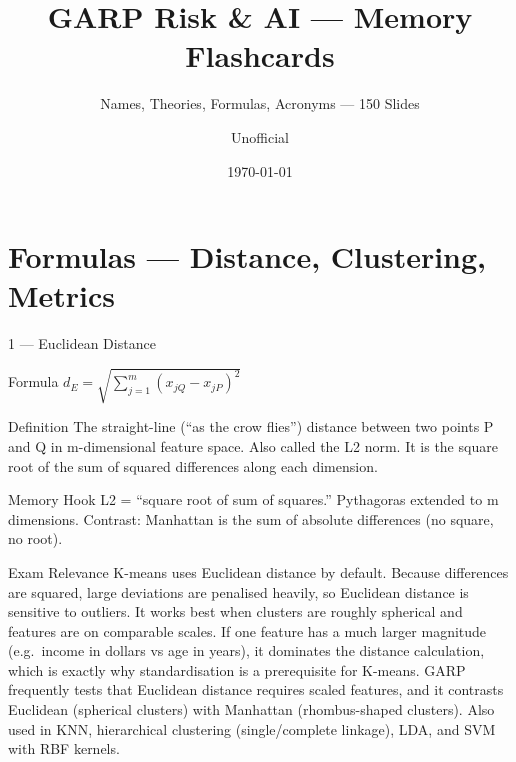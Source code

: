 \documentclass[aspectratio=169,8pt]{beamer}
\title[GARP RAI Memory]{GARP Risk \& AI --- Memory Flashcards}
\subtitle{Names, Theories, Formulas, Acronyms --- 150 Slides}
\author{Unofficial}
\date{\today}
\begin{document}
	
	\begin{frame}\titlepage\end{frame}
	
	\section{Formulas --- Distance, Clustering, Metrics}
	
	\begin{frame}{1 --- Euclidean Distance}
		\begin{block}{Formula}
			$d_E = \sqrt{\sum_{j=1}^{m}(x_{jQ} - x_{jP})^2}$
		\end{block}
		\begin{block}{Definition}
			The straight-line (``as the crow flies'') distance between two points P and Q in m-dimensional feature space. Also called the L2 norm. It is the square root of the sum of squared differences along each dimension.
		\end{block}
		\begin{block}{Memory Hook}
			L2 = ``square root of sum of squares.'' Pythagoras extended to m dimensions. Contrast: Manhattan is the sum of absolute differences (no square, no root).
		\end{block}
		\begin{block}{Exam Relevance}
			K-means uses Euclidean distance by default. Because differences are squared, large deviations are penalised heavily, so Euclidean distance is sensitive to outliers. It works best when clusters are roughly spherical and features are on comparable scales. If one feature has a much larger magnitude (e.g.\ income in dollars vs age in years), it dominates the distance calculation, which is exactly why standardisation is a prerequisite for K-means. GARP frequently tests that Euclidean distance requires scaled features, and it contrasts Euclidean (spherical clusters) with Manhattan (rhombus-shaped clusters). Also used in KNN, hierarchical clustering (single/complete linkage), LDA, and SVM with RBF kernels.
		\end{block}
	\end{frame}
	
\end{document}
